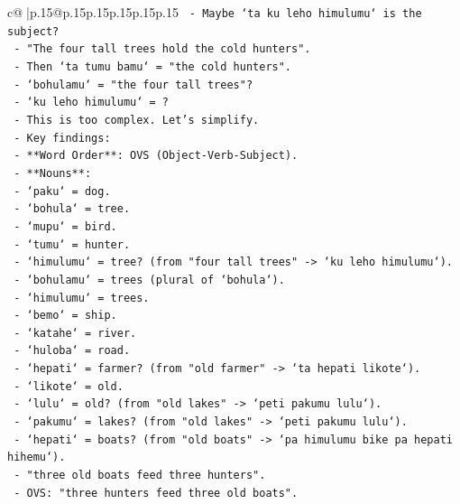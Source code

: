 \documentclass{article}
\begin{document}
{\begin{supertabular}{c@{$\;$}|p{.15\linewidth}@{}p{.15\linewidth}p{.15\linewidth}p{.15\linewidth}p{.15\linewidth}p{.15\linewidth}}
{{{\texttt{          {-} Maybe `ta ku leho himulumu` is the subject?} \\
\texttt{          {-} "The four tall trees hold the cold hunters".} \\
\texttt{          {-} Then `ta tumu bamu` = "the cold hunters".} \\
\texttt{          {-} `bohulamu` = "the four tall trees"?} \\
\texttt{          {-} `ku leho himulumu` = ?} \\
\texttt{          {-} This is too complex. Let's simplify.} \\
\texttt{          {-} Key findings:} \\
\texttt{            {-} **Word Order**: OVS (Object{-}Verb{-}Subject).} \\
\texttt{            {-} **Nouns**:} \\
\texttt{              {-} `paku` = dog.} \\
\texttt{              {-} `bohula` = tree.} \\
\texttt{              {-} `mupu` = bird.} \\
\texttt{              {-} `tumu` = hunter.} \\
\texttt{              {-} `himulumu` = tree? (from "four tall trees" {-}> `ku leho himulumu`).} \\
\texttt{              {-} `bohulamu` = trees (plural of `bohula`).} \\
\texttt{              {-} `himulumu` = trees.} \\
\texttt{              {-} `bemo` = ship.} \\
\texttt{              {-} `katahe` = river.} \\
\texttt{              {-} `huloba` = road.} \\
\texttt{              {-} `hepati` = farmer? (from "old farmer" {-}> `ta hepati likote`).} \\
\texttt{              {-} `likote` = old.} \\
\texttt{              {-} `lulu` = old? (from "old lakes" {-}> `peti pakumu lulu`).} \\
\texttt{              {-} `pakumu` = lakes? (from "old lakes" {-}> `peti pakumu lulu`).} \\
\texttt{              {-} `hepati` = boats? (from "old boats" {-}> `pa himulumu bike pa hepati hihemu`).} \\
\texttt{                {-} "three old boats feed three hunters".} \\
\texttt{                {-} OVS: "three hunters feed three old boats".} \\
}}}
\end{supertabular}}
\end{document}
